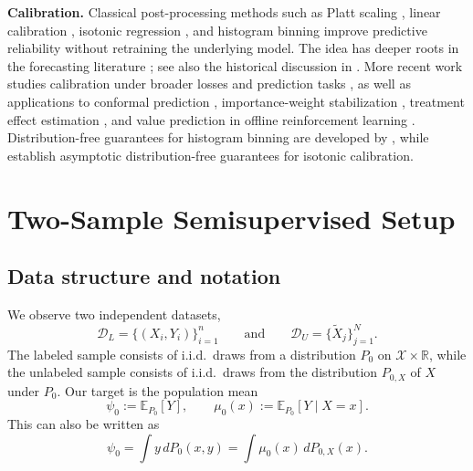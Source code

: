 \documentclass{article}
\theoremstyle{plain}
\theoremstyle{definition}
\newcommand{\E}{\mathbb{E}}
\newcommand{\1}{\mathbbm{1}}
\newcommand{\muzero}{\mu_0}
\newcommand{\Px}{P_{0,X}}
\begin{document}
\textbf{Calibration.}  Classical post-processing methods such as Platt scaling \citep{platt1999probabilistic,cox1958two,gupta2023online}, linear calibration \citep{mincer1969evaluation,chernozhukov2018generic,leng2021calibration}, isotonic regression \citep{zadrozny2002transforming,niculescu2005predicting}, and histogram binning \citep{zadrozny2001obtaining,gupta2021distribution} improve predictive reliability without retraining the underlying model. The idea has deeper roots in the forecasting literature \citep{mincer1969evaluation,lichtenstein1977calibration,vovk1992universal,vovk2005algorithmic,gneiting2007probabilistic,lambert2011elicitation}; see also the historical discussion in \citet{lee2023t}. More recent work studies calibration under broader losses and prediction tasks \citep{jung2021moment,noarov2023statistical,van2023causal,whitehouse2024orthogonal,van2025venn}, as well as applications to conformal prediction \citep{van2024self,van2025venn}, importance-weight stabilization \citep{gutman2022propensity,deshpande2023calibrated,ballinari2024improving,van2024stabilized}, treatment effect estimation \citep{chernozhukov2018generic,van2023causal,whitehouse2024orthogonal}, and value prediction in offline reinforcement learning \citep{van2025bellman,van2025semiparametric}. Distribution-free guarantees for histogram binning are developed by \citet{gupta2021distribution}, while \citet{van2023causal,van2025venn} establish asymptotic distribution-free guarantees for isotonic calibration.

 \section{Two-Sample Semisupervised Setup}
\label{sec:setup}

\subsection{Data structure and notation}

We observe two independent datasets,
\[
\mathcal D_L=\{(X_i,Y_i)\}_{i=1}^n
\qquad\text{and}\qquad
\mathcal D_U=\{\widetilde X_j\}_{j=1}^N.
\]
The labeled sample consists of i.i.d.\ draws from a distribution \(P_0\) on \(\mathcal X\times\mathbb R\), while the unlabeled sample consists of i.i.d.\ draws from the distribution \(\Px\) of \(X\) under \(P_0\). Our target is the population mean
\[
\psi_0 := \E_{P_0}[Y],
\qquad
\muzero(x):=\E_{P_0}[Y\mid X=x].
\]
This can also be written as
\[
\psi_0=\int y\,dP_0(x,y)=\int \muzero(x)\,d\Px(x).
\]
\end{document}
